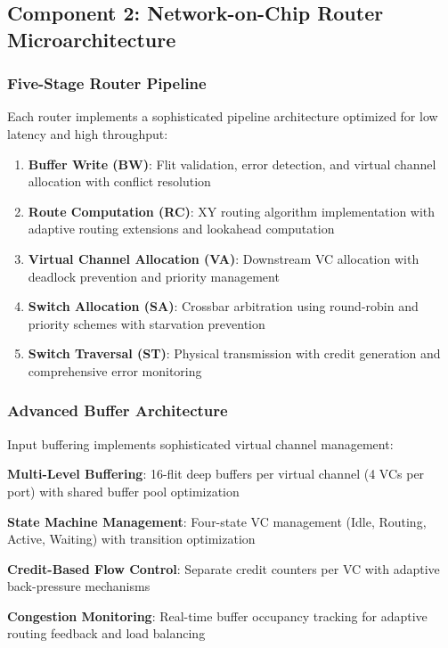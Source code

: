 \documentclass[11pt,a4paper]{article}
\begin{document}
\subsection{Component 2: Network-on-Chip Router Microarchitecture}

\subsubsection{Five-Stage Router Pipeline}
Each router implements a sophisticated pipeline architecture optimized for low latency and high throughput:

\begin{enumerate}
    \item \textbf{Buffer Write (BW)}: Flit validation, error detection, and virtual channel allocation with conflict resolution
    \item \textbf{Route Computation (RC)}: XY routing algorithm implementation with adaptive routing extensions and lookahead computation
    \item \textbf{Virtual Channel Allocation (VA)}: Downstream VC allocation with deadlock prevention and priority management
    \item \textbf{Switch Allocation (SA)}: Crossbar arbitration using round-robin and priority schemes with starvation prevention
    \item \textbf{Switch Traversal (ST)}: Physical transmission with credit generation and comprehensive error monitoring
\end{enumerate}

\subsubsection{Advanced Buffer Architecture}
Input buffering implements sophisticated virtual channel management:

\begin{techlist}
    \item \textbf{Multi-Level Buffering}: 16-flit deep buffers per virtual channel (4 VCs per port) with shared buffer pool optimization
    \item \textbf{State Machine Management}: Four-state VC management (Idle, Routing, Active, Waiting) with transition optimization
    \item \textbf{Credit-Based Flow Control}: Separate credit counters per VC with adaptive back-pressure mechanisms
    \item \textbf{Congestion Monitoring}: Real-time buffer occupancy tracking for adaptive routing feedback and load balancing
\end{techlist}
\end{document}
